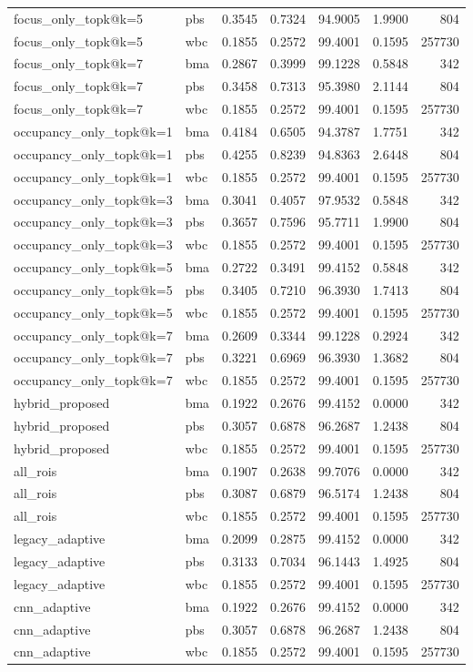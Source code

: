 \begin{tabular}{llrrrrr}
focus_only_topk@k=5 & pbs & 0.3545 & 0.7324 & 94.9005 & 1.9900 & 804 \\
focus_only_topk@k=5 & wbc & 0.1855 & 0.2572 & 99.4001 & 0.1595 & 257730 \\
focus_only_topk@k=7 & bma & 0.2867 & 0.3999 & 99.1228 & 0.5848 & 342 \\
focus_only_topk@k=7 & pbs & 0.3458 & 0.7313 & 95.3980 & 2.1144 & 804 \\
focus_only_topk@k=7 & wbc & 0.1855 & 0.2572 & 99.4001 & 0.1595 & 257730 \\
occupancy_only_topk@k=1 & bma & 0.4184 & 0.6505 & 94.3787 & 1.7751 & 342 \\
occupancy_only_topk@k=1 & pbs & 0.4255 & 0.8239 & 94.8363 & 2.6448 & 804 \\
occupancy_only_topk@k=1 & wbc & 0.1855 & 0.2572 & 99.4001 & 0.1595 & 257730 \\
occupancy_only_topk@k=3 & bma & 0.3041 & 0.4057 & 97.9532 & 0.5848 & 342 \\
occupancy_only_topk@k=3 & pbs & 0.3657 & 0.7596 & 95.7711 & 1.9900 & 804 \\
occupancy_only_topk@k=3 & wbc & 0.1855 & 0.2572 & 99.4001 & 0.1595 & 257730 \\
occupancy_only_topk@k=5 & bma & 0.2722 & 0.3491 & 99.4152 & 0.5848 & 342 \\
occupancy_only_topk@k=5 & pbs & 0.3405 & 0.7210 & 96.3930 & 1.7413 & 804 \\
occupancy_only_topk@k=5 & wbc & 0.1855 & 0.2572 & 99.4001 & 0.1595 & 257730 \\
occupancy_only_topk@k=7 & bma & 0.2609 & 0.3344 & 99.1228 & 0.2924 & 342 \\
occupancy_only_topk@k=7 & pbs & 0.3221 & 0.6969 & 96.3930 & 1.3682 & 804 \\
occupancy_only_topk@k=7 & wbc & 0.1855 & 0.2572 & 99.4001 & 0.1595 & 257730 \\
hybrid_proposed & bma & 0.1922 & 0.2676 & 99.4152 & 0.0000 & 342 \\
hybrid_proposed & pbs & 0.3057 & 0.6878 & 96.2687 & 1.2438 & 804 \\
hybrid_proposed & wbc & 0.1855 & 0.2572 & 99.4001 & 0.1595 & 257730 \\
all_rois & bma & 0.1907 & 0.2638 & 99.7076 & 0.0000 & 342 \\
all_rois & pbs & 0.3087 & 0.6879 & 96.5174 & 1.2438 & 804 \\
all_rois & wbc & 0.1855 & 0.2572 & 99.4001 & 0.1595 & 257730 \\
legacy_adaptive & bma & 0.2099 & 0.2875 & 99.4152 & 0.0000 & 342 \\
legacy_adaptive & pbs & 0.3133 & 0.7034 & 96.1443 & 1.4925 & 804 \\
legacy_adaptive & wbc & 0.1855 & 0.2572 & 99.4001 & 0.1595 & 257730 \\
cnn_adaptive & bma & 0.1922 & 0.2676 & 99.4152 & 0.0000 & 342 \\
cnn_adaptive & pbs & 0.3057 & 0.6878 & 96.2687 & 1.2438 & 804 \\
cnn_adaptive & wbc & 0.1855 & 0.2572 & 99.4001 & 0.1595 & 257730 \\
\bottomrule
\end{tabular}
